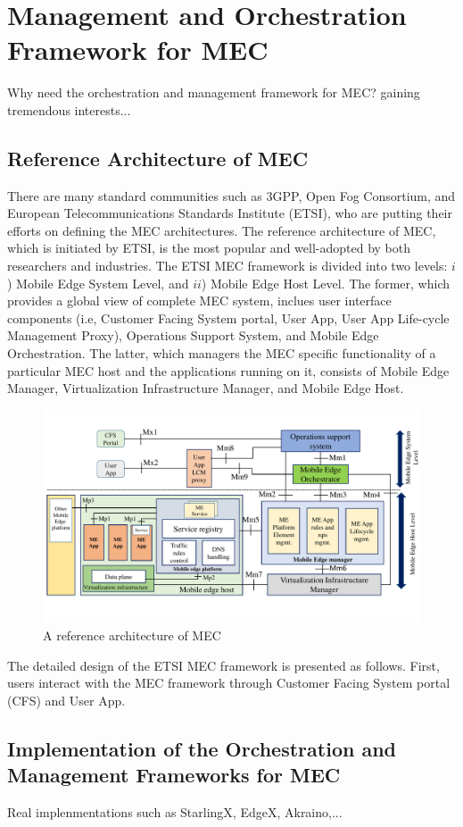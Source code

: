 \section{Management and Orchestration Framework for MEC} \label{framework}

Why need the orchestration and management framework for MEC? gaining tremendous interests...


\subsection{Reference Architecture of MEC}

There are many standard communities such as 3GPP, Open Fog Consortium, and European Telecommunications Standards Institute (ETSI), who are putting their efforts on defining the MEC architectures. 
The reference architecture of MEC, which is initiated by ETSI, is the most popular and well-adopted by both researchers and industries. The ETSI MEC framework is divided into two levels: $i$) Mobile Edge System Level, and $ii$) Mobile Edge Host Level. The former, which provides a global view of complete MEC system, inclues user interface components (i.e, Customer Facing System portal, User App, User App Life-cycle Management Proxy), Operations Support System, and Mobile Edge Orchestration. The latter, which managers the MEC specific functionality of a particular MEC host and the applications running on it, consists of Mobile Edge Manager, Virtualization Infrastructure Manager, and Mobile Edge Host.


\begin{figure}[H]
  \begin{center}
   \includegraphics[width=15cm]{./figures/book-etsi-mec.pdf}
   \caption{A reference architecture of MEC}
   \label{fig:etsi-mec}
   \end{center}
\end{figure}



The detailed design of the ETSI MEC framework is presented as follows. 
First, users interact with the MEC framework through Customer Facing System portal (CFS) and User App. 

\subsection{Implementation of the Orchestration and Management Frameworks for MEC}

Real implenmentations such as StarlingX, EdgeX, Akraino,... 
